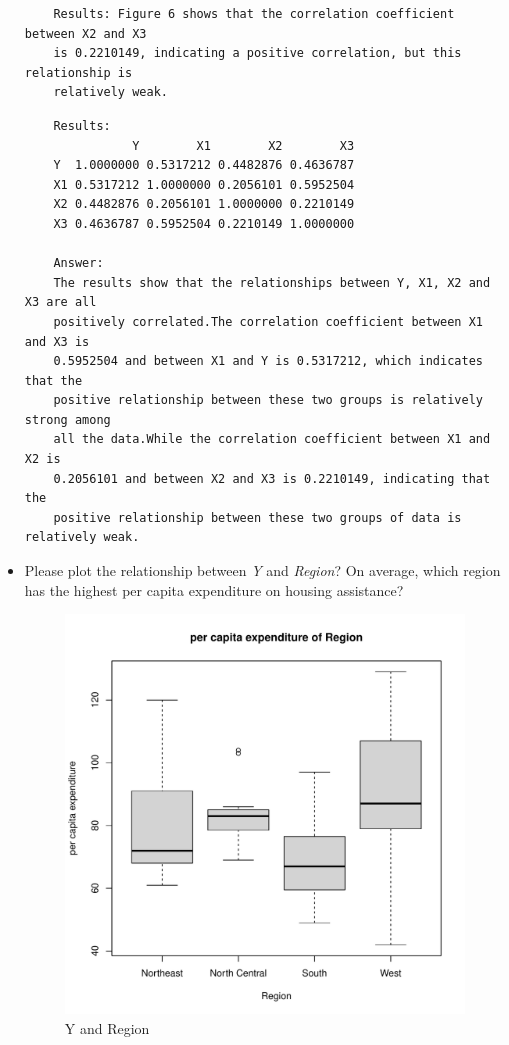 \documentclass[12pt,letterpaper]{article}
\begin{document}
\begin{itemize}
\begin{verbatim} 
	Results: Figure 6 shows that the correlation coefficient between X2 and X3 
	is 0.2210149, indicating a positive correlation, but this relationship is 
	relatively weak.
\end{verbatim}

\newpage
\begin{verbatim} 
    Results: 
               Y        X1        X2        X3
    Y  1.0000000 0.5317212 0.4482876 0.4636787
    X1 0.5317212 1.0000000 0.2056101 0.5952504
    X2 0.4482876 0.2056101 1.0000000 0.2210149
    X3 0.4636787 0.5952504 0.2210149 1.0000000
    
    Answer: 
    The results show that the relationships between Y, X1, X2 and X3 are all 
    positively correlated.The correlation coefficient between X1 and X3 is 
    0.5952504 and between X1 and Y is 0.5317212, which indicates that the 
    positive relationship between these two groups is relatively strong among 
    all the data.While the correlation coefficient between X1 and X2 is 
    0.2056101 and between X2 and X3 is 0.2210149, indicating that the 
    positive relationship between these two groups of data is relatively weak.
\end{verbatim}

\vspace{.5cm}
\item
Please plot the relationship between \emph{Y} and \emph{Region}? On average, which region has the highest per capita expenditure on housing assistance?
\vspace{.5cm}

  

\begin{figure}[h!]\centering
	\caption{\footnotesize Y and Region}
	\label{fig:plot_7}
	\includegraphics[width=.75\textwidth]{boxplot_plot7_Y&Region.pdf}
\end{figure}


\end{itemize}
\end{document}
